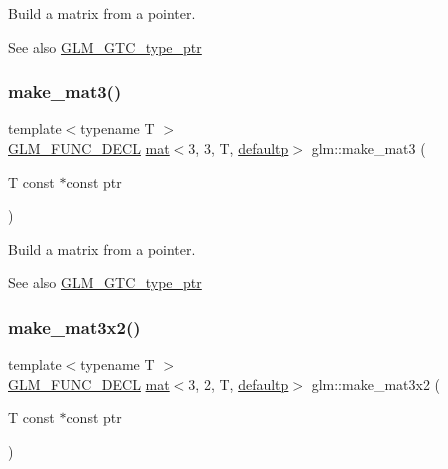 Build a matrix from a pointer. \begin{DoxySeeAlso}{See also}
\hyperlink{group__gtc__type__ptr}{G\+L\+M\+\_\+\+G\+T\+C\+\_\+type\+\_\+ptr} 
\end{DoxySeeAlso}
\mbox{\label{group__gtc__type__ptr_ga611ee7c4d4cadfc83a8fa8e1d10a170f}} 
\subsubsection{\texorpdfstring{make\+\_\+mat3()}{make\_mat3()}}
{\footnotesize\ttfamily template$<$typename T $>$ \\
\hyperlink{setup_8hpp_ab2d052de21a70539923e9bcbf6e83a51}{G\+L\+M\+\_\+\+F\+U\+N\+C\+\_\+\+D\+E\+CL} \hyperlink{structglm_1_1mat}{mat}$<$3, 3, T, \hyperlink{namespaceglm_a36ed105b07c7746804d7fdc7cc90ff25a9d21ccd8b5a009ec7eb7677befc3bf51}{defaultp}$>$ glm\+::make\+\_\+mat3 (\begin{DoxyParamCaption}\item[{T const $\ast$const}]{ptr }\end{DoxyParamCaption})}

Build a matrix from a pointer. \begin{DoxySeeAlso}{See also}
\hyperlink{group__gtc__type__ptr}{G\+L\+M\+\_\+\+G\+T\+C\+\_\+type\+\_\+ptr} 
\end{DoxySeeAlso}
\mbox{\label{group__gtc__type__ptr_ga27a24e121dc39e6857620e0f85b6e1a8}} 
\subsubsection{\texorpdfstring{make\+\_\+mat3x2()}{make\_mat3x2()}}
{\footnotesize\ttfamily template$<$typename T $>$ \\
\hyperlink{setup_8hpp_ab2d052de21a70539923e9bcbf6e83a51}{G\+L\+M\+\_\+\+F\+U\+N\+C\+\_\+\+D\+E\+CL} \hyperlink{structglm_1_1mat}{mat}$<$3, 2, T, \hyperlink{namespaceglm_a36ed105b07c7746804d7fdc7cc90ff25a9d21ccd8b5a009ec7eb7677befc3bf51}{defaultp}$>$ glm\+::make\+\_\+mat3x2 (\begin{DoxyParamCaption}\item[{T const $\ast$const}]{ptr }\end{DoxyParamCaption})}

